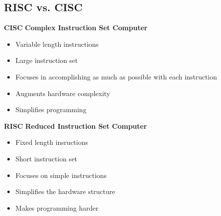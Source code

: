 \subsection{RISC vs. CISC}
\vspace{-0.5cm}
\begin{multicols}{2}
    \begin{minipage}{\linewidth}
        \textbf{CISC}\newline
        \textbf{Complex Instruction Set Computer}
        \begin{itemize}
            \item Variable length instructions
            \item Large instruction set
            \item Focuses in accomplishing as much as possible with each instruction
            \item Augments hardware complexity
            \item Simplifies programming
        \end{itemize}    
    \end{minipage}
    \begin{minipage}{\linewidth}
        \textbf{RISC}\newline
        \textbf{Reduced Instruction Set Computer}
        \begin{itemize}
            \item Fixed length insructions
            \item Short instruction set
            \item Focuses on simple instructions
            \item Simplifies the hardware structure
            \item Makes programming harder
          \end{itemize}      
    \end{minipage}
\end{multicols}

